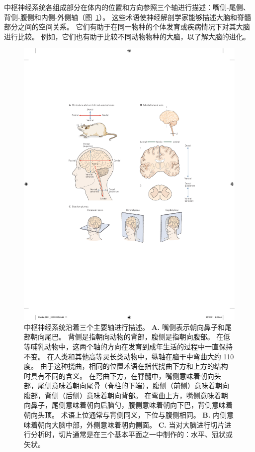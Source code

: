 \begin{proposition}[神经解剖学导航术语] \label{box:1_1}
	
	\quad \quad 中枢神经系统各组成部分在体内的位置和方向参照三个轴进行描述：嘴侧-尾侧、背侧-腹侧和内侧-外侧轴（图~\ref{fig:1_2}）。
	这些术语使神经解剖学家能够描述大脑和脊髓部分之间的空间关系。
	它们有助于在同一物种的个体发育或疾病情况下对其大脑进行比较。
	例如，它们也有助于比较不同动物物种的大脑，以了解大脑的进化。

\end{proposition}


\begin{figure}[htbp]
	\centering
	\includegraphics[width=0.9\linewidth]{chap01/fig_1_2}
	\caption{中枢神经系统沿着三个主要轴进行描述\cite{martin2012neuroanatomy}。 
		\textbf{A.} 嘴侧表示朝向鼻子和尾部朝向尾巴。
		背侧是指朝向动物的背部，腹侧是指朝向腹部。
		在低等哺乳动物中，这两个轴的方向在发育到成年生活的过程中一直保持不变。
		在人类和其他高等灵长类动物中，纵轴在脑干中弯曲大约 110 度。
		由于这种挠曲，相同的位置术语在指代挠曲下方和上方的结构时具有不同的含义。
		在弯曲下方，在脊髓中，嘴侧意味着朝向头部，尾侧意味着朝向尾骨（脊柱的下端），腹侧（前侧）意味着朝向腹部，背侧（后侧）意味着朝向背部。
		在弯曲上方，嘴侧意味着朝向鼻子，尾侧意味着朝向后脑勺，腹侧意味着朝向下巴，背侧意味着朝向头顶。
		术语上位通常与背侧同义，下位与腹侧相同。
		\textbf{B.} 内侧意味着朝向大脑中部，外侧意味着朝向侧面。
		\textbf{C.} 当对大脑进行切片进行分析时，切片通常是在三个基本平面之一中制作的：水平、冠状或矢状。}
	\label{fig:1_2}
\end{figure}



